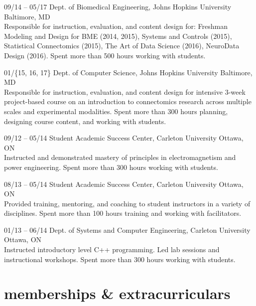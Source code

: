\documentclass[]{friggeri-cv} %
\begin{document}
\begin{entrylist}
\entry
{09/14 -- 05/17}
{Dept. of Biomedical Engineering, Johns Hopkins University}
{Baltimore, MD}
{ \\
Responsible for instruction, evaluation, and content design for: Freshman Modeling and Design
for BME (2014, 2015), Systems and Controls (2015), Statistical Connectomics (2015), The Art of
Data Science (2016), NeuroData Design (2016). Spent more than 500 hours working with students.}

\entry
{01/\{15, 16, 17\}}
{Dept. of Computer Science, Johns Hopkins University}
{Baltimore, MD}
{\\
Responsible for instruction, evaluation, and content design for intensive 3-week project-based course on an
introduction to connectomics research across multiple scales and experimental modalities. Spent more than 300 hours
planning, designing course content, and working with students.}

\entry
{09/12 -- 05/14}
{Student Academic Success Center, Carleton University}
{Ottawa, ON}
{\\
Instructed and demonstrated mastery of principles in electromagnetism and power engineering. Spent more than 300 hours
working with students.}

\entry
{08/13 -- 05/14}
{Student Academic Success Center, Carleton University}
{Ottawa, ON}
{\\
Provided training, mentoring, and coaching to student instructors in a variety of disciplines. Spent more than 100
hours training and working with facilitators.}

\entry
{01/13 -- 06/14}
{Dept. of Systems and Computer Engineering, Carleton University}
{Ottawa, ON}
{\\
Instructed introductory level C++ programming. Led lab sessions and instructional workshops. Spent more than 300 hours
working with students.}
\end{entrylist}


\section{memberships \& extracurriculars}
\end{document}
